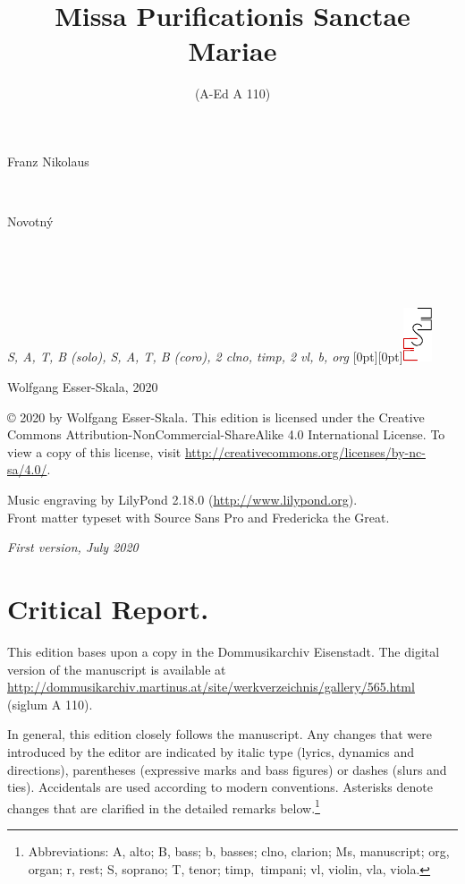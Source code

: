 \documentclass[parskip=full]{scrreprt}
\makeatletter
\DeclareRobustCommand{\sbseries}{\fontseries{sb}\selectfont}
\newcommand\fancytitlehead{
	\headingfont%
	\fontsize{80}{80}\selectfont\textcolor{black!80}{\@ifundefined{@shortname}{\@lastname}{\@shortname}.}\\[15pt]%
	\fontsize{60}{60}\selectfont\@ifundefined{@shorttitle}{\@title}{\@shorttitle}.%
}
\def\firstname#1{\def\@firstname{#1}}
\def\lastname#1{\def\@lastname{#1}}
\def\shortname#1{\def\@shortname{#1}}
\def\shorttitle#1{\def\@shorttitle{#1}}
\def\instrumentation#1{\def\@instrumentation{#1}}
\def\maketitle{%
\begin{titlepage}%
	\Large%
	{\@titlehead}%
	\vfill%
	{\strut\@firstname}\\%
	{\sbseries\color{oldred}\strut\@lastname}\\%
	{\strut\@namesuffix}%
	\vfill%
	{\sbseries\@title}\\%
	{\@subtitle}\\[\baselineskip]%
	{\itshape\@instrumentation}%
	\vfill%
	{\itshape\@parts}\hspace*{\fill}\raisebox{0pt}[0pt][0pt]{\includegraphics{ees_logo}}%
\end{titlepage}%
}
\newif\ifprintreport\printreportfalse
\makeatother
\begin{document}
\frenchspacing

\titlehead{\fancytitlehead}
\firstname{Franz Nikolaus}
\lastname{Novotný}
\title{Missa Purificationis Sanctae Mariae}
\shorttitle{M. Purificationis}
\subtitle{(A-Ed A 110)}
\instrumentation{S, A, T, B (solo), S, A, T, B (coro), 2 clno, timp, 2 vl, b, org}
\maketitle


\thispagestyle{empty}

\vspace*{\fill}

\hspace*{1em}Wolfgang Esser-Skala, 2020

© 2020 by Wolfgang Esser-Skala. This edition is licensed under the Creative Commons Attribution-NonCommercial-ShareAlike 4.0 International License. To view a copy of this license, visit \url{http://creativecommons.org/licenses/by-nc-sa/4.0/}. 

Music engraving by LilyPond 2.18.0 (\url{http://www.lilypond.org}).\\
Front matter typeset with Source Sans Pro and Fredericka the Great.

\textit{First version, July 2020}

\vspace*{2cm}

\ifprintreport
\chapter*{Critical Report.}

This edition bases upon a copy in the Dommusikarchiv Eisenstadt. The digital version of the manuscript is available at \url{http://dommusikarchiv.martinus.at/site/werkverzeichnis/gallery/565.html} (siglum A 110).

In general, this edition closely follows the manuscript. Any changes that were introduced by the editor are indicated by italic type (lyrics, dynamics and directions), parentheses (expressive marks and bass figures) or dashes (slurs and ties). Accidentals are used according to modern conventions. Asterisks denote changes that are clarified in the detailed remarks below.\footnote{Abbreviations: A, alto; B, bass; b, basses; clno, clarion; Ms, manuscript; org, organ; r, rest; S, soprano; T, tenor; timp,~timpani; vl, violin, vla, viola.}
\end{document}
